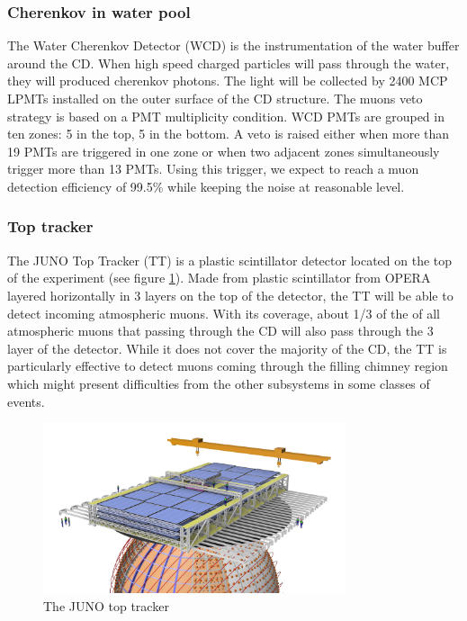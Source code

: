 \subsubsection{Cherenkov in water pool}

The Water Cherenkov Detector (WCD) is the instrumentation of the water buffer around the CD. When high speed charged particles will pass through the water, they will produced cherenkov photons. The light will be collected by 2400 MCP LPMTs installed on the outer surface of the CD structure. The  muons veto strategy is based on a PMT multiplicity condition. WCD PMTs are grouped in ten zones: 5 in the top, 5 in the bottom. A veto is raised either when more than 19 PMTs are triggered in one zone or when two adjacent zones simultaneously trigger more than 13 PMTs. Using this trigger, we expect to reach a muon detection efficiency of 99.5\% while keeping the noise at reasonable level.

\subsubsection{Top tracker}
The JUNO Top Tracker (TT) is a plastic scintillator detector located on the top of the experiment (see figure \ref{fig:juno:tt}). Made from plastic scintillator from OPERA \cite{acquafredda_opera_2009} layered horizontally in 3 layers on the top of the detector, the TT will be able to detect incoming atmospheric muons.
With its coverage, about 1/3 of the of all atmospheric muons that passing through the CD will also pass through the 3 layer of the detector. While it does not cover the majority of the CD, the TT is particularly effective to detect muons coming through the filling chimney region which might present difficulties from the other subsystems in some classes of events.
\begin{figure}[ht]
  \centering
  \includegraphics[height=5cm]{images/juno/Global_TT_01.png}
  \caption{The JUNO top tracker}
  \label{fig:juno:tt}
\end{figure}

